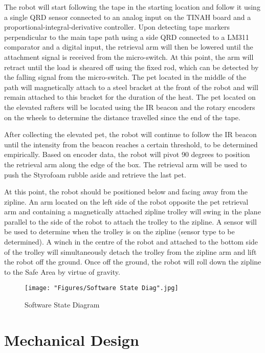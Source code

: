 \documentclass[11pt, oneside]{article} %
\begin{document}
The robot will start following the tape in the starting location and follow it using a single QRD sensor connected to an analog input on the TINAH board and a proportional-integral-derivative controller. Upon detecting tape markers perpendicular to the main tape path using a side QRD connected to a LM311 comparator and a digital input, the retrieval arm will then be lowered until the attachment signal is received from the micro-switch. At this point, the arm will retract until the load is sheared off using the fixed rod, which can be detected by the falling signal from the micro-switch. The pet located in the middle of the path will magnetically attach to a steel bracket at the front of the robot and will remain attached to this bracket for the duration of the heat. The pet located on the elevated rafters will be located using the IR beacon and the rotary encoders on the wheels to determine the distance travelled since the end of the tape.

After collecting the elevated pet, the robot will continue to follow the IR beacon until the intensity from the beacon reaches a certain threshold, to be determined empirically. Based on encoder data, the robot will pivot 90 degrees to position the retrieval arm along the edge of the box. The retrieval arm will be used to push the Styrofoam rubble aside and retrieve the last pet.

At this point, the robot should be positioned below and facing away from the zipline. An arm located on the left side of the robot opposite the pet retrieval arm and containing a magnetically attached zipline trolley will swing in the plane parallel to the side of the robot to attach the trolley to the zipline. A sensor will be used to determine when the trolley is on the zipline (sensor type to be determined). A winch in the centre of the robot and attached to the bottom side of the trolley will simultaneously detach the trolley from the zipline arm and lift the robot off the ground. Once off the ground, the robot will roll down the zipline to the Safe Area by virtue of gravity.

\begin{figure}[h]
	\centering
	\texttt{[image: "Figures/Software State Diag".jpg]}
	\caption[Software State Diagram]{Software State Diagram}
	\label{fig:SoftStates}
\end{figure}

\section{Mechanical Design}
\end{document}
